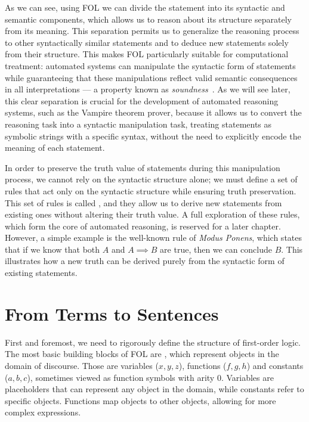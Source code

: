 As we can see, using FOL we can divide the statement into its syntactic and semantic components, which allows us to reason about its structure separately from its meaning.
This separation permits us to generalize the reasoning process to other syntactically similar statements and to deduce new statements solely from their structure.
This makes FOL particularly suitable for computational treatment: automated systems can manipulate the syntactic form of statements while guaranteeing that these manipulations reflect valid semantic consequences in all interpretations — a property known as \emph{soundness}~\cite{enderton2001}.
As we will see later, this clear separation is crucial for the development of automated reasoning systems, such as the Vampire theorem prover, because it allows us to convert the reasoning task into a syntactic manipulation task, treating statements as symbolic strings with a specific syntax, without the need to explicitly encode the meaning of each statement.

In order to preserve the truth value of statements during this manipulation process, we cannot rely on the syntactic structure alone; we must define a set of rules that act only on the syntactic structure while ensuring truth preservation.
This set of rules is called , and they allow us to derive new statements from existing ones without altering their truth value.
A full exploration of these rules, which form the core of automated reasoning, is reserved for a later chapter. However, a simple example is the well-known rule of \emph{Modus Ponens}, which states that if we know that both \(A\) and \(A\implies B\) are true, then we can conclude \(B\). This illustrates how a new truth can be derived purely from the syntactic form of existing statements.

\section{From Terms to Sentences}\label{sec:from-terms-to-sentences}

First and foremost, we need to rigorously define the structure of first-order logic.
The most basic building blocks of FOL are , which represent objects in the domain of discourse.
Those are variables (\(x,y,z\)), functions (\(f,g,h\)) and constants (\(a,b,c\)), sometimes viewed as function symbols with arity 0.
Variables are placeholders that can represent any object in the domain, while constants refer to specific objects. Functions map objects to other objects, allowing for more complex expressions.

